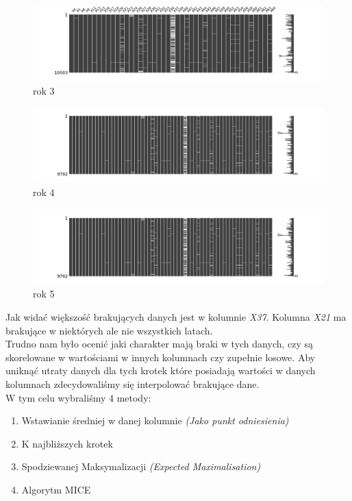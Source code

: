 \documentclass[11pt]{article}
\begin{document}
\begin{figure}[h]
\caption{rok 3}
	\includegraphics[width=\textwidth]{year_3}
\end{figure}

\begin{figure}[h]
\caption{rok 4}
	\includegraphics[width=\textwidth]{year_4}
\end{figure}

\begin{figure}[h]
\caption{rok 5}
	\includegraphics[width=\textwidth]{year_5}
\end{figure}

Jak widać większość brakujących danych jest w kolumnie \textit{X37}. Kolumna \textit{X21} ma brakujące w niektórych ale nie wszystkich latach.\\
Trudno nam było ocenić jaki charakter mają braki w tych danych, czy są skorelowane w wartościami w innych kolumnach czy zupełnie losowe. Aby uniknąć utraty danych dla tych krotek które posiadają wartości w danych kolumnach zdecydowaliśmy się interpolować brakujące dane.\\
W tym celu wybraliśmy 4 metody:
\begin{enumerate}
	\item Wstawianie średniej w danej kolumnie \textit{(Jako punkt odniesienia)}
	\item K najbliższych krotek
	\item Spodziewanej Maksymalizacji \textit{(Expected Maximalisation)}
	\item Algorytm MICE
\end{enumerate}
\end{document}
